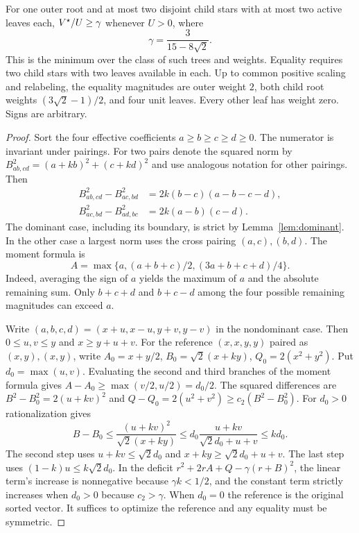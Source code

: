 \begin{theorem}\label{thm:seven}
For one outer root and at most two disjoint child stars with at most
two active leaves each, $V^\star/U\ge\gamma$ whenever $U>0$, where
\[
 \gamma=\frac3{15-8\sqrt2}.
\]
This is the minimum over the class of such trees and weights. Equality
requires two child stars with two leaves available in each. Up to
common positive scaling and relabeling, the equality magnitudes are
outer weight $2$, both child root weights $(3\sqrt2-1)/2$, and four
unit leaves. Every other leaf has weight zero. Signs are arbitrary.
\end{theorem}
\begin{proof}
Sort the four effective coefficients $a\ge b\ge c\ge d\ge0$.
The numerator is invariant under pairings. For two pairs denote the
squared norm by $B_{ab,cd}^2=(a+kb)^2+(c+kd)^2$ and use analogous
notation for other pairings. Then
\begin{align*}
 B_{ab,cd}^2-B_{ac,bd}^2&=2k(b-c)(a-b-c-d),\\
 B_{ac,bd}^2-B_{ad,bc}^2&=2k(a-b)(c-d).
\end{align*}
The dominant case, including its boundary, is strict by
Lemma~\ref{lem:dominant}. In the other case a largest norm uses the
cross pairing $(a,c),(b,d)$. The moment formula is
\[
 A=\max\{a,(a+b+c)/2,(3a+b+c+d)/4\}.
\]
Indeed, averaging the sign of $a$ yields the maximum of $a$ and the
absolute remaining sum. Only $b+c+d$ and $b+c-d$ among the four
possible remaining magnitudes can exceed $a$.

Write $(a,b,c,d)=(x+u,x-u,y+v,y-v)$ in the nondominant case.
Then $0\le u,v\le y$ and $x\ge y+u+v$. For the reference
$(x,x,y,y)$ paired as $(x,y),(x,y)$, write
$A_0=x+y/2$, $B_0=\sqrt2(x+ky)$, $Q_0=2(x^2+y^2)$.
Put $d_0=\max(u,v)$. Evaluating the second and third branches of
the moment formula gives $A-A_0\ge\max(v/2,u/2)=d_0/2$.
The squared differences are $B^2-B_0^2=2(u+kv)^2$ and
$Q-Q_0=2(u^2+v^2)\ge c_2(B^2-B_0^2)$.
For $d_0>0$ rationalization gives
\[
 B-B_0\le \frac{(u+kv)^2}{\sqrt2(x+ky)}
 \le d_0\frac{u+kv}{\sqrt2d_0+u+v}\le k d_0.
\]
The second step uses $u+kv\le\sqrt2d_0$ and
$x+ky\ge\sqrt2d_0+u+v$. The last step uses $(1-k)u\le k\sqrt2d_0$. In the deficit
$r^2+2rA+Q-\gamma(r+B)^2$, the linear term's increase is
nonnegative because $\gamma k<1/2$, and the constant term strictly
increases when $d_0>0$ because $c_2>\gamma$. When $d_0=0$ the
reference is the original sorted vector. It suffices to optimize
the reference and any equality must be symmetric.


\end{proof}
